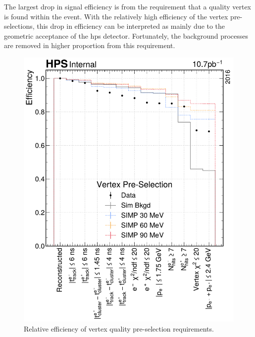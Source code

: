 The largest drop in signal efficiency is from the requirement that a quality vertex is found
within the event.
With the relatively high efficiency of the vertex pre-selections, this drop in efficiency
can be interpreted as mainly due to the geometric acceptance of the \ac{hps} detector.
Fortunately, the background processes are removed in higher proportion from this requirement.

\begin{figure}
  \centering
  \includegraphics[width=\textwidth]{figures/hps/dataset/vertex-pre-selection-efficiency.pdf}
  \caption{Relative efficiency of vertex quality pre-selection requirements.}
  \label{fig:vertex-pre-selection}
\end{figure}

